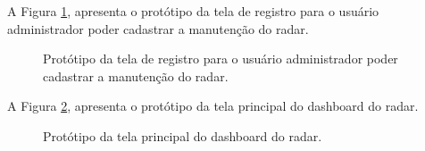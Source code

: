 A Figura \ref{fig:tela_registro}, apresenta o protótipo da tela de registro para o usuário administrador poder cadastrar a manutenção do radar.

\begin{figure}[!h]
	\caption{\label{fig:tela_registro} Protótipo da tela de registro para o usuário administrador poder cadastrar a manutenção do radar.}
\end{figure}\newpage

A Figura \ref{fig:tela_dashboard}, apresenta o protótipo da tela principal do dashboard do radar.

\begin{figure}[!h]
	\caption{\label{fig:tela_dashboard} Protótipo da tela principal do dashboard do radar.}
\end{figure}
